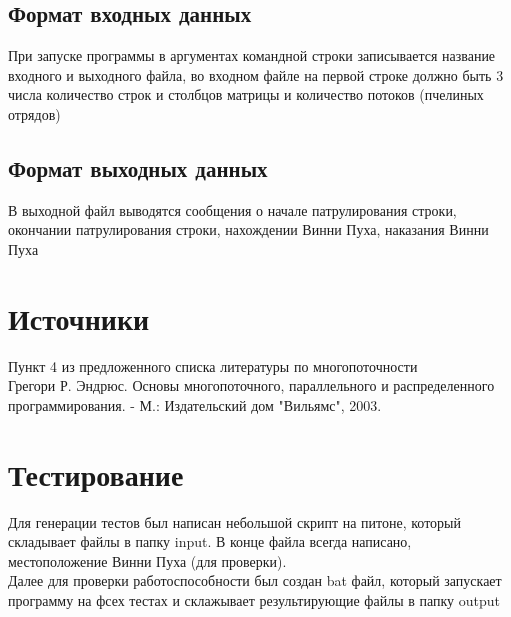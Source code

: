 \documentclass[14pt,a4paper]{article}
\begin{document}
    \subsection{Формат входных данных}
    При запуске программы в аргументах командной строки записывается название входного и выходного файла, во входном файле на первой строке должно быть 3 числа количество строк и столбцов матрицы и количество потоков (пчелиных отрядов)
    \subsection{Формат выходных данных}
    В выходной файл выводятся сообщения о начале патрулирования строки, окончании патрулирования строки, нахождении Винни Пуха, наказания Винни Пуха

    \section{Источники}
    Пункт 4 из предложенного списка литературы по многопоточности\\
    Грегори Р. Эндрюс. Основы многопоточного, параллельного и распределенного программирования. - М.: Издательский дом "Вильямс", 2003.

    \section{Тестирование}
    Для генерации тестов был написан небольшой скрипт на питоне, который складывает файлы в папку input. В конце файла всегда написано, местоположение Винни Пуха (для проверки).\\
    Далее для проверки работоспособности был создан bat файл, который запускает программу на фсех тестах и склажывает результирующие файлы в папку output

    
\end{document}
